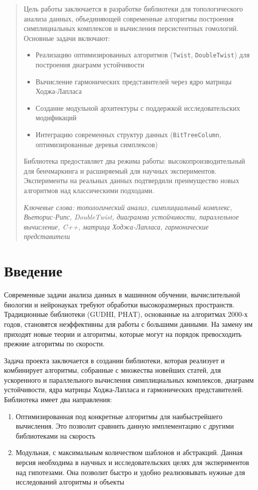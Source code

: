 \documentclass{article}
\begin{document}
\makeTitlePage

\tableofcontents
\newpage
\begin{abstract}
  Цель работы заключается в разработке библиотеки для топологического анализа данных, объединяющей современные алгоритмы построения симплициальных комплексов и вычисления персистентных гомологий. Основные задачи включают:
  \begin{itemize}
    \item Реализацию оптимизированных алгоритмов (\texttt{Twist}, \texttt{DoubleTwist}) для построения диаграмм устойчивости
    \item Вычисление гармонических представителей через ядро матрицы Ходжа-Лапласа
    \item Создание модульной архитектуры с поддержкой исследовательских модификаций
    \item Интеграцию современных структур данных (\texttt{BitTreeColumn}, оптимизированные деревья симплексов)
  \end{itemize}
  Библиотека предоставляет два режима работы: высокопроизводительный для бенчмаркинга и расширяемый для научных экспериментов. Эксперименты на реальных данных подтвердили преимущество новых алгоритмов над классическими подходами.

  \textit{Ключевые слова: топологический анализ, симплициальный комплекс, Вьеторис-Рипс, DoubleTwist, диаграмма устойчивости, параллельное вычисление, C++, матрица Ходжа-Лапласа, гармонические представители}
\end{abstract}
\section{Введение}

Современные задачи анализа данных в машинном обучении, вычислительной биологии и нейронауках требуют обработки высокоразмерных пространств. Традиционные библиотеки (GUDHI, PHAT), основанные на алгоритмах 2000-х годов, становятся неэффективны для работы с большими данными. На замену им приходят новые теории и алгоритмы, которые могут на порядок превосходить прежние алгоритмы по скорости.

Задача проекта заключается в создании библиотеки, которая реализует и комбинирует алгоритмы, собранные с множества новейших статей, для ускоренного и параллельного вычисления симплициальных комплексов, диаграмм устойчивости, ядра матрицы Ходжа-Лапласа и гармонических представителей. Библиотека имеет два направления:
\begin{enumerate}
  \item Оптимизированная под конкретные алгоритмы для наибыстрейшего вычисления. Это позволит сравнить данную имплементацию с другими библиотеками на скорость
  \item Модульная, с максимальным количеством шаблонов и абстракций. Данная версия необходима в научных и исследовательских целях для экспериментов над гипотезами. Она позволит быстро и удобно реализовывать нужные для исследований алгоритмы и объекты
\end{enumerate}
\end{document}
